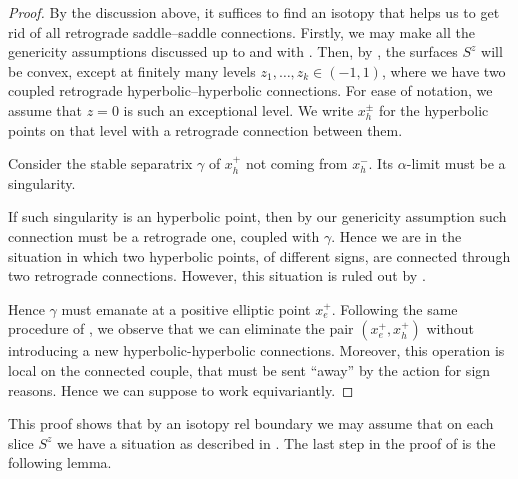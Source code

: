 \documentclass[a4paper, 11pt]{amsart}
\theoremstyle{plain}
\theoremstyle{definition}
\begin{document}
\begin{proof}
	By the discussion above, it suffices to find an isotopy that helps us to get rid of all retrograde saddle–saddle connections. Firstly, we may make all the genericity assumptions discussed up to and with . Then, by , the surfaces $S^z$ will be convex, except at finitely many levels $z_1, \dots,z_k \in (-1,1)$, where we have two coupled retrograde hyperbolic–hyperbolic connections. For ease of notation, we assume that $z = 0$ is such an exceptional level. We write $x^{\pm}_h$ for the hyperbolic points on that level with a retrograde connection	between them.
	
	Consider the stable separatrix $\gamma$ of $x_h^+$ not coming from $x_h^-$. Its $\alpha$-limit must be a singularity.
	
	If such singularity is an hyperbolic point, then by our genericity assumption such connection must be a retrograde one, coupled with $\gamma$. Hence we are in the situation in which two hyperbolic points, of different signs, are connected through two retrograde connections. However, this situation is ruled out by .
	
	Hence $\gamma$ must emanate at a positive elliptic point $x_e^+$. Following the same procedure of \cite[Prop.\ 4.9.7]{geigesIntroductionContactTopology2008}, we observe that we can eliminate the pair $(x_e^+, x_h^+)$ without introducing a new hyperbolic-hyperbolic connections. Moreover, this operation is local on the connected couple, that must be sent ``away'' by the action for sign reasons. Hence we can suppose to work equivariantly.
\end{proof}
This proof shows that by an isotopy rel boundary we may assume that on each slice $S^z$ we have a situation as described in . The last step in the proof of  is the following lemma.
\end{document}
